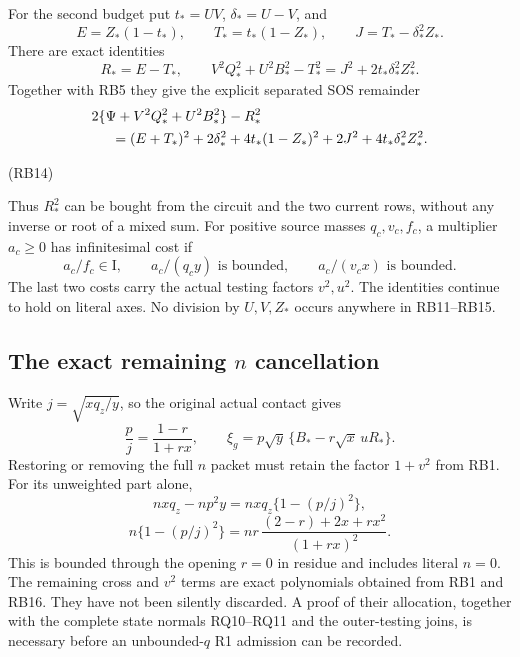 For the second budget put $t_*=UV$, $\delta_*=U-V$, and
\[
 E=Z_*(1-t_*),\qquad T_*=t_*(1-Z_*),\qquad
 J=T_*-\delta_*^2Z_*.
\]
There are exact identities
\[
 R_*=E-T_*,\qquad
 V^2Q_*^2+U^2B_*^2-T_*^2
                =J^2+2t_*\delta_*^2Z_*^2.
\tag{RB13}
\]
Together with RB5 they give the explicit separated SOS remainder
\begin{align*}
&2\{\Psi+V^2Q_*^2+U^2B_*^2\}-R_*^2\\
&\hspace{5mm}=(E+T_*)^2+2\delta_*^2+
 4t_*(1-Z_*)^2+2J^2+4t_*\delta_*^2Z_*^2 .
\end{align*}
\par\noindent\hfill\textup{(RB14)}\par
Thus $R_*^2$ can be bought from the circuit and the two current rows,
without any inverse or root of a mixed sum.
For positive source masses $q_c,v_c,f_c$, a multiplier $a_c\ge0$
has infinitesimal cost if
\[
 a_c/f_c\in\mathrm I,\qquad
 a_c/(q_cy)\text{ is bounded},\qquad
 a_c/(v_cx)\text{ is bounded}.
\tag{RB15}
\]
The last two costs carry the actual testing factors $v^2,u^2$.
The identities continue to hold on literal axes. No division by
$U,V,Z_*$ occurs anywhere in RB11--RB15.

\subsection{The exact remaining $n$ cancellation}

Write $j=\sqrt{xq_z/y}$, so the original actual contact gives
\[
 \frac pj=\frac{1-r}{1+rx},\qquad
 \xi_g=p\sqrt y\,\{B_*-r\sqrt x\,uR_*\}.
\tag{RB16}
\]
Restoring or removing the full $n$ packet must retain the factor
$1+v^2$ from RB1. For its unweighted part alone,
\[
 nxq_z-np^2y=nxq_z\{1-(p/j)^2\},
\]
\[
 n\{1-(p/j)^2\}
 =nr\,\frac{(2-r)+2x+rx^2}{(1+rx)^2}.
\tag{RB17}
\]
This is bounded through the opening $r=0$ in residue and includes
literal $n=0$. The remaining cross and $v^2$ terms are exact
polynomials obtained from RB1 and RB16. They have not been silently
discarded. A proof of their allocation, together with the complete
state normals RQ10--RQ11 and the outer-testing joins, is necessary
before an unbounded-$q$ R1 admission can be recorded.
